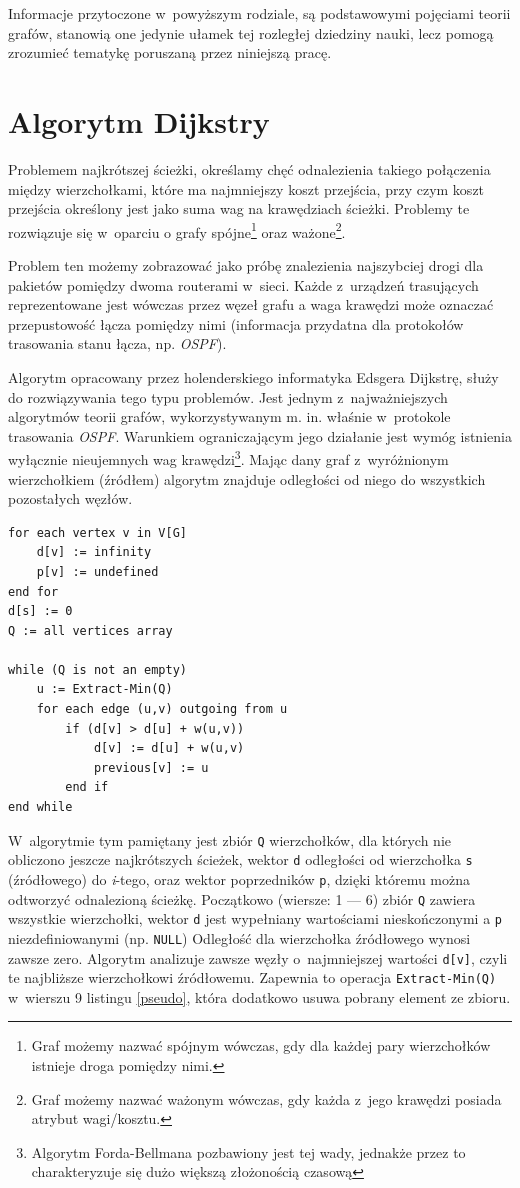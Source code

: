 \documentclass[a4paper,12pt,polish,twoside,openright]{thesis}
\newcommand\code[1]{\lstinline[style=line]{#1}}
\begin{document}
Informacje przytoczone w~powyższym rodziale, są podstawowymi pojęciami teorii grafów, stanowią one jedynie ułamek tej rozległej dziedziny nauki, lecz pomogą zrozumieć tematykę poruszaną przez niniejszą pracę.

\section{Algorytm Dijkstry}
\label{chap:dijkstra_theory}
Problemem najkrótszej ścieżki, określamy chęć odnalezienia takiego połączenia między wierzchołkami, które ma najmniejszy koszt przejścia, przy czym koszt przejścia określony jest jako suma wag na krawędziach ścieżki\cite{dijkstra}.
Problemy te rozwiązuje się w~oparciu o grafy spójne\footnote{Graf możemy nazwać spójnym wówczas, gdy dla każdej pary wierzchołków istnieje droga pomiędzy nimi.} oraz ważone\footnote{Graf możemy nazwać ważonym wówczas, gdy każda z~jego krawędzi posiada atrybut wagi/kosztu.}.

Problem ten możemy zobrazować jako próbę znalezienia najszybciej drogi dla pakietów pomiędzy dwoma routerami w~sieci.
Każde z~urządzeń trasujących reprezentowane jest wówczas przez węzeł grafu a waga krawędzi może oznaczać przepustowość łącza pomiędzy nimi (informacja przydatna dla protokołów trasowania stanu łącza, np. \emph{OSPF}\cite{ospf}).

Algorytm opracowany przez holenderskiego informatyka Edsgera Dijkstrę, służy do rozwiązywania tego typu problemów.
Jest jednym z~najważniejszych algorytmów teorii grafów, wykorzystywanym m. in. właśnie w~protokole trasowania \emph{OSPF}.
Warunkiem ograniczającym jego działanie jest wymóg istnienia wyłącznie nieujemnych wag krawędzi\footnote{Algorytm Forda-Bellmana pozbawiony jest tej wady, jednakże przez to charakteryzuje się dużo większą złożonością czasową\cite{graphtheory}}.
Mając dany graf z~wyróżnionym wierzchołkiem (źródłem) algorytm znajduje odległości od niego do wszystkich pozostałych węzłów.

\begin{lstlisting}[style=code,caption=Pseudokod algorytmu Dijkstry\cite{dijkstra},label=pseudo]
for each vertex v in V[G]
	d[v] := infinity
	p[v] := undefined
end for
d[s] := 0
Q := all vertices array

while (Q is not an empty)
	u := Extract-Min(Q)
	for each edge (u,v) outgoing from u
		if (d[v] > d[u] + w(u,v))
			d[v] := d[u] + w(u,v)
			previous[v] := u
		end if
end while
\end{lstlisting}
W~algorytmie tym pamiętany jest zbiór \code{Q} wierzchołków, dla których nie obliczono jeszcze najkrótszych ścieżek, wektor \code{d} odległości od wierzchołka \code{s} (źródłowego) do \emph{i}-tego, oraz wektor poprzedników \code{p}, dzięki któremu można odtworzyć odnalezioną ścieżkę.
Początkowo (wiersze: 1 --- 6) zbiór \code{Q} zawiera wszystkie wierzchołki, wektor \code{d} jest wypełniany wartościami nieskończonymi a \code{p} niezdefiniowanymi (np. \code{NULL})
Odległość dla wierzchołka źródłowego wynosi zawsze zero.
Algorytm analizuje zawsze węzły o~najmniejszej wartości \code{d[v]}, czyli te najbliższe wierzchołkowi źródłowemu.
Zapewnia to operacja \code{Extract-Min(Q)} w~wierszu 9 listingu \ref{pseudo}, która dodatkowo usuwa pobrany element ze zbioru.
\end{document}
